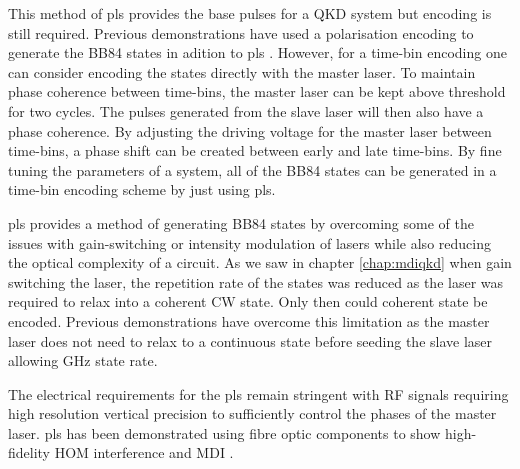 This method of \ac{pls} provides the base pulses for a \ac{QKD} system but encoding is still required. Previous demonstrations have used a polarisation encoding to generate the BB84 states in adition to \ac{pls} \cite{Comandar2016}. However, for a time-bin encoding one can consider encoding the states directly with the master laser. To maintain phase coherence between time-bins, the master laser can be kept above threshold for two cycles. The pulses generated from the slave laser will then also have a phase coherence. By adjusting the driving voltage for the master laser between time-bins, a phase shift can be created between early and late time-bins. By fine tuning the parameters of a system, all of the BB84 states can be generated in a time-bin encoding scheme by just using \ac{pls}.

\begin{parahigh}
\Ac{pls} provides a method of generating BB84 states by overcoming some of the issues with gain-switching or intensity modulation of lasers while also reducing the optical complexity of a circuit. As we saw in chapter \ref{chap:mdiqkd} when gain switching the laser, the repetition rate of the states was reduced as the laser was required to relax into a coherent \ac{CW} state. Only then could coherent state be encoded. Previous demonstrations \cite{Comandar2016PLS, Comandar2016} have overcome this limitation as the master laser does not need to relax to a continuous state before seeding the slave laser allowing GHz state rate. 
\end{parahigh}

The electrical requirements for the \ac{pls} remain stringent with RF signals requiring high resolution vertical precision to sufficiently control the phases of the master laser. \Ac{pls} has been demonstrated using fibre optic components to show high-fidelity \ac{HOM} interference and \ac{MDI} \cite{Comandar2016PLS, Comandar2016}. 


